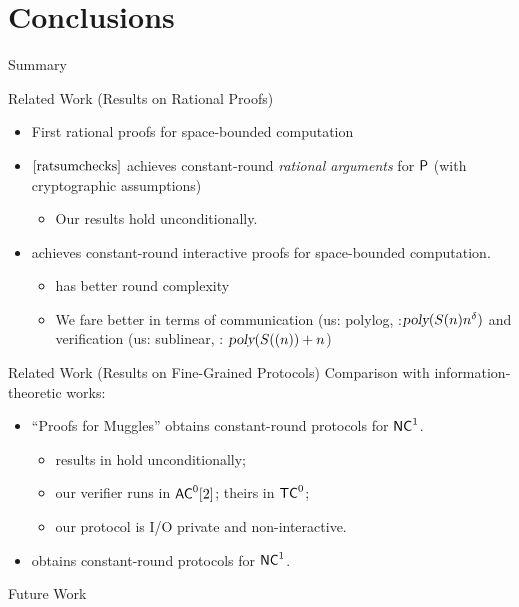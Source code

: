 \section{Conclusions}

\begin{frame}{Summary}
	
\end{frame}

\begin{frame}{Related Work (Results on Rational Proofs)}
\begin{itemize}
	\item First rational proofs for space-bounded computation
	\item $\cite{ratsumchecks}$ achieves constant-round \textit{rational arguments} for $\P$ (with cryptographic assumptions)
	\begin{itemize}
		\item Our results hold unconditionally.
	\end{itemize}
	\item \cite{rrr16} achieves constant-round interactive proofs for space-bounded computation.
	\begin{itemize}
		\item \cite{rrr16} has better round complexity
		\item We fare better in terms of communication (us: polylog, \cite{rrr16}:$\poly(S(n)n^{\delta})$ and verification (us: sublinear, \cite{rrr16}: $\poly(S((n)) + n$)
	\end{itemize}
\end{itemize}
\end{frame}


\begin{frame}{Related Work (Results on Fine-Grained Protocols)}
	Comparison with information-theoretic works:
	\begin{itemize}
		\item ``Proofs for Muggles'' \cite{muggles} obtains constant-round protocols for $\NC^1$.
		\begin{itemize}
			\item results in \cite{muggles} hold unconditionally; 
			\item our verifier runs in $\ACzt$; theirs in $\TC^0$;
			\item our protocol is I/O private and non-interactive.
		\end{itemize}
		\item \cite{gghkr07} obtains constant-round protocols for $\NC^1$.
	\end{itemize}
\end{frame}

\begin{frame}{Future Work}
	
\end{frame}